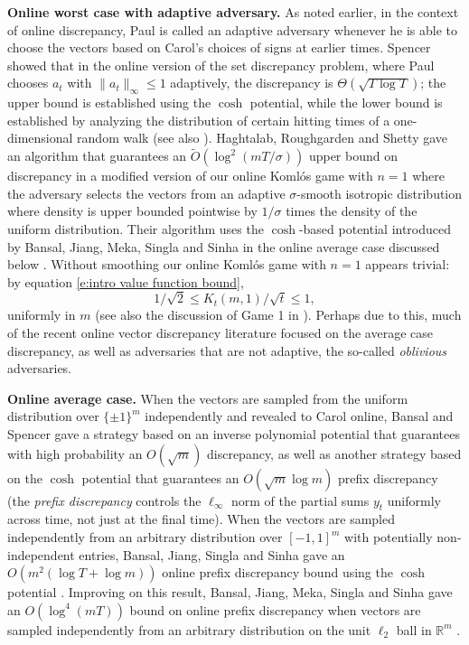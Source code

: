 \documentclass[reqno]{amsart}
\numberwithin{equation}{section}
\newcommand{\R}{\mathbb R}
\begin{document}
 \textbf{Online worst case with adaptive adversary.}    As noted earlier, in the context of online discrepancy, Paul is called an adaptive adversary whenever he is able to choose the vectors based on Carol's choices of signs at earlier times.  Spencer showed that in the online version of the set discrepancy problem, where Paul chooses $a_t$ with $\|a_t\|_\infty \leq 1$  adaptively, the  discrepancy is  $\Theta (\sqrt {T \log T})$; the upper bound is established using the $\cosh$ potential, while the lower bound is established by  analyzing the distribution of certain hitting times of a one-dimensional random walk \cite[Lecture 4]{Spe94} (see also \cite{Spencer86}).   Haghtalab,  Roughgarden and  Shetty gave an algorithm that guarantees an $\tilde O(\log^2(mT/\sigma))$ upper bound on discrepancy  in a modified version of our online Koml\'os game  with $n=1$ where the adversary selects the vectors from an adaptive $\sigma$-smooth isotropic distribution where density is upper bounded pointwise by $1/\sigma$ times the density of the uniform distribution. Their algorithm uses  the $\cosh$-based potential  introduced by  Bansal, Jiang, Meka,  Singla and  Sinha in the  online average case   discussed below  \cite {HRS24,BJMSS21}. Without smoothing our online Koml\'os  game with  $n=1$ appears trivial: by equation \eqref{e:intro value function bound}, 
 \[
 1/\sqrt{2} \leq K_{t}(m,1)/\sqrt{t} \leq 1,
 \] uniformly in $m$ (see also the discussion of Game 1 in \cite {Spencer77}). Perhaps due to this, much of the recent online vector discrepancy literature focused on  the average case discrepancy, as well as  adversaries  that are  not adaptive, the so-called \emph{oblivious} adversaries. 

\textbf{Online average case.} When the vectors are sampled from the uniform  distribution over $\{\pm 1\}^m$ independently and revealed to Carol online, Bansal and Spencer gave  a strategy based on an inverse polynomial potential that guarantees with high probability an $O (\sqrt {m})$ discrepancy, as well as another  strategy based on the $\cosh$ potential that guarantees an $O (\sqrt {m } \log m)$ prefix discrepancy  \cite {BS20} (the \emph{prefix discrepancy}  controls the $\ell_\infty$ norm of the partial sums $y_t$ uniformly across time, not  just at the final time). When the vectors  are sampled independently from an arbitrary distribution over $[-1,1]^m$ with potentially non-independent entries, Bansal, Jiang, Singla  and Sinha gave an $O(m^2( \log T + \log m))$ online prefix discrepancy bound using the $\cosh$ potential \cite {BJSS20}. Improving on this result, Bansal, Jiang, Meka, Singla  and Sinha gave an $O( \log^4 (mT))$  bound on online prefix discrepancy when vectors are sampled independently from an arbitrary distribution on the unit $\ell_2$  ball in $\R^m$    \cite{BJMSS21}. 
\end{document}
